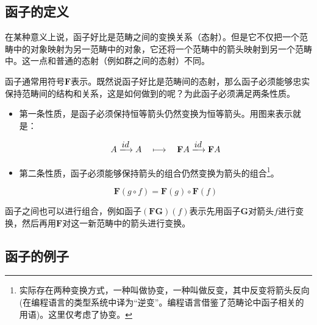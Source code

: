 \documentclass[b5paper]{ctexart}
\begin{document}
\subsection{函子的定义}
在某种意义上说，函子好比是范畴之间的变换关系（态射）。但是它不仅把一个范畴中的对象映射为另一范畴中的对象，它还将一个范畴中的箭头映射到另一个范畴中。这一点和普通的态射（例如群之间的态射）不同。

函子通常用符号$\mathbf{F}$表示。既然说函子好比是范畴间的态射，那么函子必须能够忠实保持范畴间的结构和关系，这是如何做到的呢？为此函子必须满足两条性质。

\begin{itemize}
\item 第一条性质，是函子必须保持恒等箭头仍然变换为恒等箭头。用图来表示就是：

\[
A \arrowto{id} A \quad \longmapsto \quad \mathbf{F}A \arrowto{id} \mathbf{F}A
\]

 
\item 第二条性质，函子必须能够保持箭头的组合仍然变换为箭头的组合\footnote{实际存在两种变换方式，一种叫做协变，一种叫做反变，其中反变将箭头反向(在编程语言的类型系统中译为“逆变”。编程语言借鉴了范畴论中函子相关的用语)。这里仅考虑了协变。}。

\begin{center}
\end{center}

\[
\mathbf{F}(g \circ f) = \mathbf{F}(g) \circ \mathbf{F}(f)
\]
\end{itemize}

函子之间也可以进行组合，例如函子$(\mathbf{F} \mathbf{G})(f)$表示先用函子$\mathbf{G}$对箭头$f$进行变换，然后再用$\mathbf{F}$对这一新范畴中的箭头进行变换。

\subsection{函子的例子}
\label{sec:functor:examples}
\end{document}
